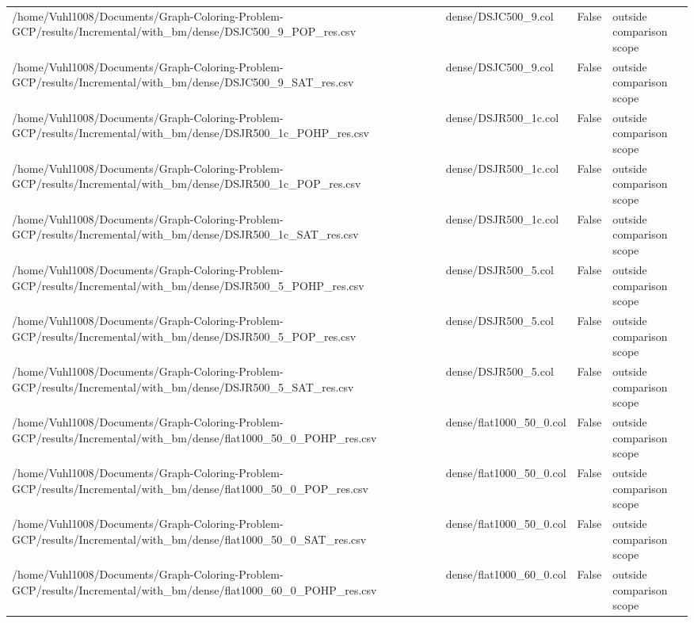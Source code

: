 \begin{table}[htbp]
\begin{tabular}{llll}
/home/Vuhl1008/Documents/Graph-Coloring-Problem-GCP/results/Incremental/with\_bm/dense/DSJC500\_9\_POP\_res.csv & dense/DSJC500\_9.col & False & outside comparison scope \\
/home/Vuhl1008/Documents/Graph-Coloring-Problem-GCP/results/Incremental/with\_bm/dense/DSJC500\_9\_SAT\_res.csv & dense/DSJC500\_9.col & False & outside comparison scope \\
/home/Vuhl1008/Documents/Graph-Coloring-Problem-GCP/results/Incremental/with\_bm/dense/DSJR500\_1c\_POHP\_res.csv & dense/DSJR500\_1c.col & False & outside comparison scope \\
/home/Vuhl1008/Documents/Graph-Coloring-Problem-GCP/results/Incremental/with\_bm/dense/DSJR500\_1c\_POP\_res.csv & dense/DSJR500\_1c.col & False & outside comparison scope \\
/home/Vuhl1008/Documents/Graph-Coloring-Problem-GCP/results/Incremental/with\_bm/dense/DSJR500\_1c\_SAT\_res.csv & dense/DSJR500\_1c.col & False & outside comparison scope \\
/home/Vuhl1008/Documents/Graph-Coloring-Problem-GCP/results/Incremental/with\_bm/dense/DSJR500\_5\_POHP\_res.csv & dense/DSJR500\_5.col & False & outside comparison scope \\
/home/Vuhl1008/Documents/Graph-Coloring-Problem-GCP/results/Incremental/with\_bm/dense/DSJR500\_5\_POP\_res.csv & dense/DSJR500\_5.col & False & outside comparison scope \\
/home/Vuhl1008/Documents/Graph-Coloring-Problem-GCP/results/Incremental/with\_bm/dense/DSJR500\_5\_SAT\_res.csv & dense/DSJR500\_5.col & False & outside comparison scope \\
/home/Vuhl1008/Documents/Graph-Coloring-Problem-GCP/results/Incremental/with\_bm/dense/flat1000\_50\_0\_POHP\_res.csv & dense/flat1000\_50\_0.col & False & outside comparison scope \\
/home/Vuhl1008/Documents/Graph-Coloring-Problem-GCP/results/Incremental/with\_bm/dense/flat1000\_50\_0\_POP\_res.csv & dense/flat1000\_50\_0.col & False & outside comparison scope \\
/home/Vuhl1008/Documents/Graph-Coloring-Problem-GCP/results/Incremental/with\_bm/dense/flat1000\_50\_0\_SAT\_res.csv & dense/flat1000\_50\_0.col & False & outside comparison scope \\
/home/Vuhl1008/Documents/Graph-Coloring-Problem-GCP/results/Incremental/with\_bm/dense/flat1000\_60\_0\_POHP\_res.csv & dense/flat1000\_60\_0.col & False & outside comparison scope \\

\end{tabular}
\end{table}
